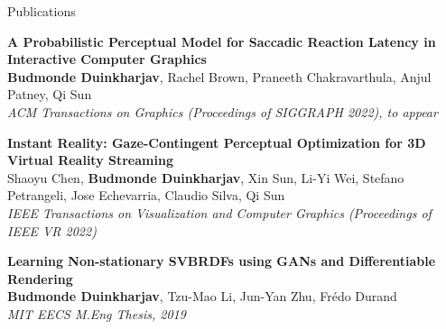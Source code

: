 \documentclass{resume}
\begin{document}
\begin{area}{Publications}
    \item
        \textbf{A Probabilistic Perceptual Model for Saccadic Reaction Latency in Interactive Computer Graphics} \\
        \textbf{Budmonde Duinkharjav}, Rachel Brown, Praneeth Chakravarthula, Anjul Patney, Qi Sun \\
        \emph{ACM Transactions on Graphics (Proceedings of SIGGRAPH 2022), to appear}
    \item
        \textbf{Instant Reality: Gaze-Contingent Perceptual Optimization for 3D Virtual Reality Streaming} \\
        Shaoyu Chen, \textbf{Budmonde Duinkharjav}, Xin Sun, Li-Yi Wei, Stefano Petrangeli, Jose Echevarria, Claudio Silva, Qi Sun \\
        \emph{IEEE Transactions on Visualization and Computer Graphics (Proceedings of IEEE VR 2022)}
    \item
        \textbf{Learning Non-stationary SVBRDFs using GANs and Differentiable Rendering} \\
        \textbf{Budmonde Duinkharjav}, Tzu-Mao Li, Jun-Yan Zhu, Fr\'edo Durand \\
        \emph{MIT EECS M.Eng Thesis, 2019}
\end{area}

\pagebreak
\end{document}
